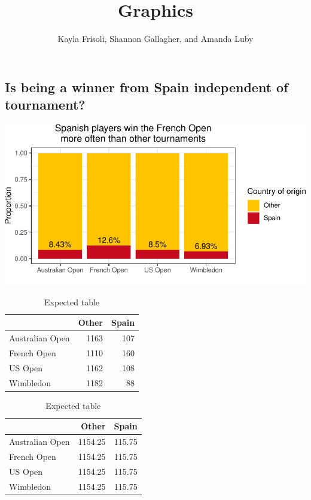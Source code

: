 \documentclass[]{article}
\title{Graphics}
\author{Kayla Frisoli, Shannon Gallagher, and Amanda Luby}
\date{}
\begin{document}
\maketitle

\subsection{Is being a winner from Spain independent of
tournament?}\label{is-being-a-winner-from-spain-independent-of-tournament}

\begin{center}\includegraphics{graphics_files/figure-latex/unnamed-chunk-1-1} \end{center}

\begin{table}[!htb]
    \begin{minipage}{.5\linewidth}
      \caption{Actual table}
      \centering 
\begin{tabular}{lrr}
\toprule
  & Other & Spain\\
\midrule
Australian Open & 1163 & 107\\
French Open & 1110 & 160\\
US Open & 1162 & 108\\
Wimbledon & 1182 & 88\\
\bottomrule
\end{tabular} \end{minipage}%
    \begin{minipage}{.5\linewidth}
      \centering
        \caption{Expected table} 
\begin{tabular}{lrr}
\toprule
  & Other & Spain\\
\midrule
Australian Open & 1154.25 & 115.75\\
French Open & 1154.25 & 115.75\\
US Open & 1154.25 & 115.75\\
Wimbledon & 1154.25 & 115.75\\
\bottomrule
\end{tabular} \end{minipage} 
\end{table}
\end{document}
